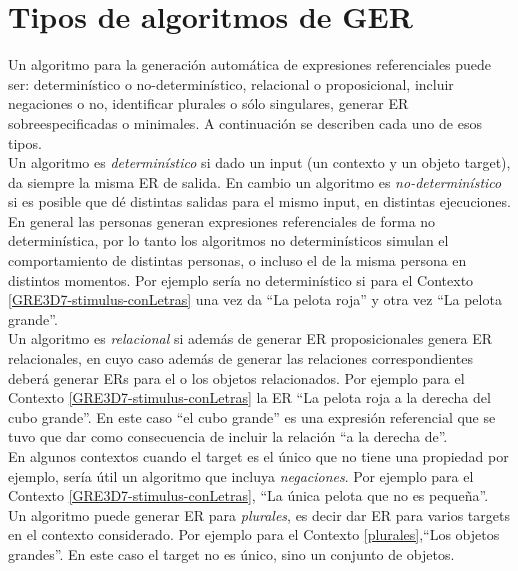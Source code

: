 \section{Tipos de algoritmos de GER}

Un algoritmo para la generaci\'on autom\'atica de expresiones referenciales  puede ser: determin\'{i}stico o no-determin\'{i}stico, relacional o proposicional, incluir negaciones o no, identificar plurales o s\'olo singulares,
generar ER sobreespecificadas o minimales.  A continuaci\'on se describen cada uno de esos tipos.\\

Un algoritmo es {\it determin\'{i}stico} si dado un input (un contexto y un objeto target), da siempre la misma ER de salida. En cambio un algoritmo es {\it no-determin\'{i}stico} si es posible que d\'e distintas salidas para el mismo input, en distintas ejecuciones. En general las personas generan expresiones referenciales de forma no determin\'istica, por lo tanto los algoritmos no determin\'isticos simulan el comportamiento de distintas personas, o incluso el de la misma persona en distintos momentos. Por ejemplo ser\'ia no determin\'istico si para el Contexto \ref{GRE3D7-stimulus-conLetras} una vez da ``La pelota roja'' y otra vez ``La pelota grande''.\\

Un algoritmo es {\it relacional} si adem\'as de generar ER proposicionales genera ER relacionales, en cuyo caso adem\'as de generar las relaciones correspondientes deber\'a generar ERs para el o los objetos relacionados. Por ejemplo para el Contexto \ref{GRE3D7-stimulus-conLetras} la ER ``La pelota roja a la derecha del cubo grande''. En este caso ``el cubo grande'' es una expresi\'on referencial que se tuvo que dar como consecuencia de incluir la relaci\'on ``a la derecha de''.\\

En algunos contextos cuando el target es el \'unico que no tiene una propiedad por ejemplo, ser\'ia \'util un algoritmo que incluya {\it negaciones}. Por ejemplo para el Contexto \ref{GRE3D7-stimulus-conLetras}, ``La \'unica pelota que no es peque\~na''.\\

Un algoritmo puede generar ER para {\it plurales}, es decir dar ER para varios targets en el contexto considerado. Por ejemplo para el Contexto \ref{plurales},``Los objetos grandes''. En este caso el target no es \'unico, sino un conjunto de objetos. \\

